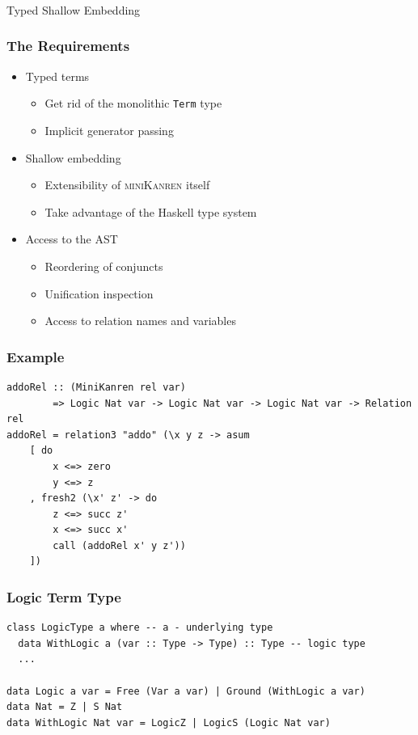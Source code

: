 \documentclass[xcolor={dvipsnames}, aspectratio=169]{beamer}
\newcommand{\mk}{\textsc{miniKanren}\xspace}
\begin{document}
\begin{frame}[fragile]
  \frametitle{}
\begin{center}
  \LARGE Typed Shallow Embedding
\end{center}
\end{frame}

\begin{frame}[fragile]
  \frametitle{The Requirements}
  \begin{itemize}
    \item Typed terms
    \begin{itemize}
      \item Get rid of the monolithic \lstinline{Term} type 
      \item Implicit generator passing
    \end{itemize}
    \item Shallow embedding
    \begin{itemize}
      \item Extensibility of \mk itself
      \item Take advantage of the Haskell type system
    \end{itemize}
    \item Access to the AST 
    \begin{itemize}
      \item Reordering of conjuncts 
      \item Unification inspection
      \item Access to relation names and variables
    \end{itemize}
  \end{itemize}
\end{frame}

\begin{frame}[fragile]
  \frametitle{Example}
\begin{lstlisting}[language=ocanren1]
addoRel :: (MiniKanren rel var) 
        => Logic Nat var -> Logic Nat var -> Logic Nat var -> Relation rel
addoRel = relation3 "addo" (\x y z -> asum
    [ do
        x <=> zero
        y <=> z
    , fresh2 (\x' z' -> do
        z <=> succ z'
        x <=> succ x'
        call (addoRel x' y z'))
    ])
\end{lstlisting}
\end{frame}

\begin{frame}[fragile]
  \frametitle{Logic Term Type}
\begin{lstlisting}[language=ocanren1]
class LogicType a where -- a - underlying type
  data WithLogic a (var :: Type -> Type) :: Type -- logic type
  ...

data Logic a var = Free (Var a var) | Ground (WithLogic a var)
data Nat = Z | S Nat
data WithLogic Nat var = LogicZ | LogicS (Logic Nat var)
\end{lstlisting}
\end{frame}
\end{document}
